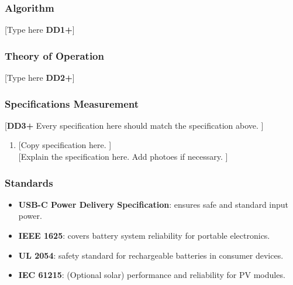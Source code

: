 \subsubsection{Algorithm}
[Type here \textbf{DD1+}]

\subsubsection{Theory of Operation}
[Type here \textbf{DD2+}]
\subsubsection{Specifications Measurement}
[\textbf{DD3+} Every specification here should match the specification above. ]
\begin{enumerate}
    \item {[Copy specification here. ]} \\
          {[Explain the specification here. Add photoes if necessary. ]}
\end{enumerate}

\subsubsection{Standards}
\begin{itemize}
    \item \textbf{USB-C Power Delivery Specification}: ensures safe and standard input power.
    \item \textbf{IEEE 1625}: covers battery system reliability for portable electronics.
    \item \textbf{UL 2054}: safety standard for rechargeable batteries in consumer devices.
    \item \textbf{IEC 61215}: (Optional solar) performance and reliability for PV modules.
\end{itemize}
